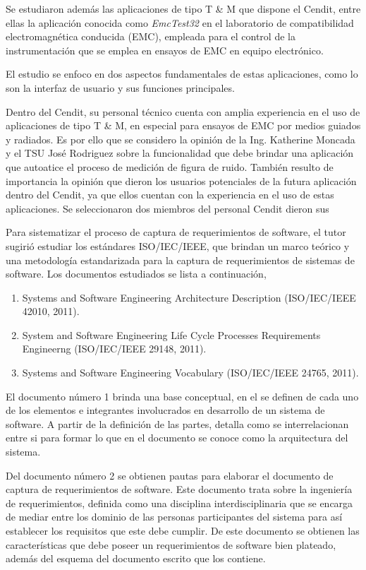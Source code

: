 \documentclass[paper=letter,oneside,fontsize=12pt, parskip=full]{article}
\begin{document}
	Se estudiaron además las aplicaciones de tipo T \& M que dispone el Cendit, entre ellas la aplicación conocida como \emph{EmcTest32} en el laboratorio de compatibilidad electromagnética conducida (EMC), empleada para el control de la instrumentación que se emplea en ensayos de EMC en equipo electrónico.
	
	El estudio se enfoco en dos aspectos fundamentales de estas aplicaciones, como lo son la interfaz de usuario y sus funciones principales. 
	
	Dentro del Cendit, su personal técnico cuenta con amplia experiencia en el uso de aplicaciones de tipo T \& M, en especial para ensayos de EMC por medios guiados y radiados. Es por ello que se considero la opinión de la Ing. Katherine Moncada y el TSU José Rodriguez sobre la funcionalidad que debe brindar una aplicación que autoatice el proceso de medición de figura de ruido.  También resulto de importancia la opinión que dieron los usuarios potenciales de la futura aplicación dentro del Cendit, ya que ellos cuentan con la experiencia en el uso de estas aplicaciones. Se seleccionaron dos miembros del personal Cendit dieron sus 	

	Para sistematizar el proceso de captura de requerimientos de software, el tutor sugirió estudiar los estándares ISO/IEC/IEEE, que brindan un marco teórico y una metodología estandarizada para la captura de requerimientos de sistemas de software. Los documentos estudiados se lista a continuación,
	
	\begin{enumerate}  
		\item Systems and Software Engineering Architecture Description (ISO/IEC/IEEE 42010, 2011).		
		\item System and Software Engineering Life Cycle Processes Requirements Engineerng (ISO/IEC/IEEE 29148, 2011).
		\item Systems and Software Engineering Vocabulary (ISO/IEC/IEEE 24765, 2011).	
	\end{enumerate}
	
	El documento número 1 brinda una base conceptual, en el se definen de cada uno de los elementos e integrantes involucrados en desarrollo de un sistema de software. A partir de la definición de las partes, detalla como se interrelacionan entre si para formar lo que en el documento se conoce como la arquitectura del sistema. 
	
	Del documento número 2 se obtienen pautas para elaborar el documento de captura de requerimientos de software. Este documento trata sobre la ingeniería de requerimientos, definida como una disciplina interdisciplinaria que se encarga de mediar entre los dominio de las personas participantes del sistema para así establecer los requisitos que este debe cumplir. De este documento se obtienen las características que debe poseer un requerimientos de software bien plateado, además del esquema del documento escrito que los contiene.
	
\end{document}
